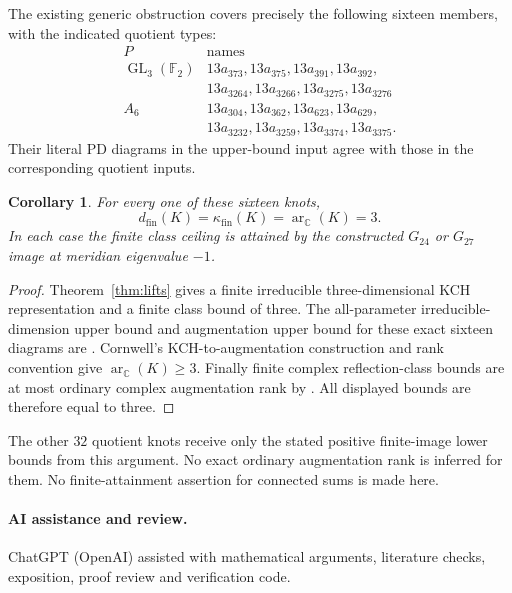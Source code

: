 \documentclass[11pt]{article}
\newtheorem{corollary}[theorem]{Corollary}
\newcommand{\C}{\mathbb C}
\newcommand{\F}{\mathbb F}
\newcommand{\GL}{\operatorname{GL}}
\newcommand{\ar}{\operatorname{ar}_{\C}}
\newcommand{\kfin}{\kappa_{\mathrm{fin}}}
\newcommand{\dfin}{d_{\mathrm{fin}}}
\begin{document}
The existing generic obstruction covers precisely the following
sixteen members, with the indicated quotient types:
\[
\begin{array}{c|l}
 P&\text{names}\\\hline
 \GL_3(\F_2)&
 13a_{373},13a_{375},13a_{391},13a_{392},\\
 &13a_{3264},13a_{3266},13a_{3275},13a_{3276}\\[2pt]
 A_6&13a_{304},13a_{362},13a_{623},13a_{629},\\
 &13a_{3232},13a_{3259},13a_{3374},13a_{3375}.
\end{array}
\]
Their literal PD diagrams in the upper-bound input agree with those
in the corresponding quotient inputs.

\newpage
\begin{corollary}\label{cor:sixteen}
For every one of these sixteen knots,
\[
                 \dfin(K)=\kfin(K)=\ar(K)=3.
\]
In each case the finite class ceiling is attained by the constructed
$G_{24}$ or $G_{27}$ image at meridian eigenvalue $-1$.
\end{corollary}
\begin{proof}
Theorem~\ref{thm:lifts} gives a finite irreducible three-dimensional
KCH representation and a finite class bound of three.
The all-parameter irreducible-dimension upper bound and augmentation
upper bound for these exact sixteen diagrams are
\cite[Theorem~\texttt{thm:all16}, Corollary~\texttt{cor:augmentation}]{generic}.
Cornwell's KCH-to-augmentation construction and rank convention
\cite[Proposition~2.12, Definition~1.8]{cor17} give $\ar(K)\ge3$.
Finally finite complex reflection-class bounds are at most ordinary
complex augmentation rank by \cite[Theorem~\texttt{thm:domination}]{domination}.
All displayed bounds are therefore equal to three.
\end{proof}

The other $32$ quotient knots receive only the stated positive
finite-image lower bounds from this argument. No exact ordinary
augmentation rank is inferred for them. No finite-attainment
assertion for connected sums is made here.

\paragraph{AI assistance and review.}
ChatGPT (OpenAI) assisted with mathematical arguments, literature checks,
exposition, proof review and verification code.
\end{document}
